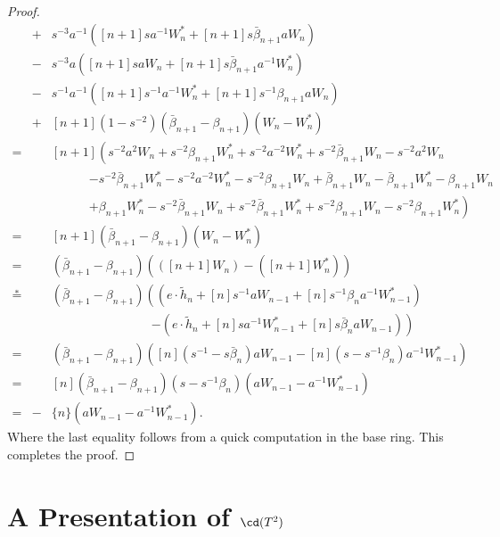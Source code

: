 \begin{proof}
\begin{eqnarray*}
&+& s^{-3}a^{-1}\left( [n+1]sa^{-1}W^*_n + [n+1]s\bar{\beta}_{n+1}aW_n \right) \\
&-&s^{-3}a\left( [n+1]saW_n + [n+1]s\bar{\beta}_{n+1}a^{-1}W^*_n \right) \\
&-& s^{-1}a^{-1}\left( [n+1]s^{-1}a^{-1}W^*_n + [n+1]s^{-1}\beta_{n+1}aW_n \right) \\
&+& [n+1]\left(1-s^{-2} \right) \left( \bar{\beta}_{n+1} - \beta_{n+1} \right) \left( W_n - W^*_n \right)\\
=&& [n+1]\left( s^{-2}a^2W_n + s^{-2}\beta_{n+1}W^*_n + s^{-2}a^{-2}W^*_n + s^{-2}\bar{\beta}_{n+1}W_n - s^{-2}a^{2}W_n \right. \\
&&\qquad\quad \left. - s^{-2}\bar{\beta}_{n+1}W^*_n - s^{-2}a^{-2}W^*_n - s^{-2}\beta_{n+1}W_n + \bar{\beta}_{n+1}W_n - \bar{\beta}_{n+1}W^*_n - \beta_{n+1}W_n \right. \\
&&\qquad\quad \left. + \beta_{n+1}W^*_n - s^{-2}\bar{\beta}_{n+1}W_n + s^{-2}\bar{\beta}_{n+1}W^*_n + s^{-2}\beta_{n+1}W_n - s^{-2}\beta_{n+1}W^*_n \right) \\
=&& [n+1]\left( \bar{\beta}_{n+1} - \beta_{n+1} \right) \left( W_n - W^*_n \right) \\
=&& \left( \bar{\beta}_{n+1} - \beta_{n+1} \right) \left( \left( [n+1]W_n \right) - \left( [n+1]W^*_n \right) \right) \\
\overset{\ast}{=}&& \left( \bar{\beta}_{n+1} - \beta_{n+1} \right) \left( \left( e \cdot \tilde{h}_{n} + [n]s^{-1}aW_{n-1} + [n]s^{-1}\beta_{n}a^{-1}W^*_{n-1} \right) \right. \\
&& \qquad\qquad\qquad\qquad \left. -\left( e \cdot \tilde{h}_{n} + [n]sa^{-1}W^*_{n-1} + [n]s\bar{\beta}_{n}aW_{n-1} \right) \right) \\
=&& \left( \bar{\beta}_{n+1} - \beta_{n+1} \right) \left( [n]\left( s^{-1} - s\bar{\beta}_{n} \right) aW_{n-1} - [n]\left( s-s^{-1}\beta_{n} \right) a^{-1}W^*_{n-1} \right) \\
=&& [n]\left(\bar{\beta}_{n+1} - \beta_{n+1} \right) \left( s - s^{-1}\beta_{n} \right) \left( aW_{n-1} - a^{-1}W^*_{n-1} \right) \\
=&-& \{n\}\left( aW_{n-1} - a^{-1}W^*_{n-1} \right).
\end{eqnarray*}
Where the last equality follows from a quick computation in the base ring. This completes the proof.
\end{proof}


\section{A Presentation of $\cd(T^2)$}

